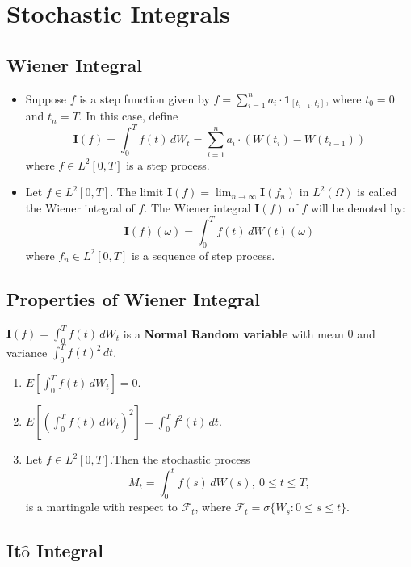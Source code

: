 \documentclass[twoside,final]{hcmut-report}
\begin{document}
\pagebreak

\section{Stochastic Integrals}

\subsection{Wiener Integral}
 \begin{itemize}
        \item Suppose $f$ is a step function given by $f = \sum_{i=1}^n a_i \cdot \mathbf{1}_{[t_{i-1}, t_i]}$, where $t_0 = 0$ and $t_n = T$. In this case, define 
        \[\mathbf{I}(f) = \int_0^{T}{f(t)\,dW_t} = \sum_{i=1}^n a_i \cdot (W(t_i) - W(t_{i-1}))\]
        where $f \in L^2[0,T]$ is a step process.

            \item Let $f \in L^2[0,T]$. The limit $\mathbf{I}(f) = \lim_{n \to \infty} \mathbf{I}(f_n)$ in $L^2(\Omega)$ is called the Wiener integral of $f$. The Wiener integral $\mathbf{I}(f)$ of $f$ will be denoted by:
\[ \mathbf{I}(f)(\omega) = \int_{0}^{T} f(t) \, dW(t)(\omega) \]
 where $f_n \in L^2[0,T]$ is a sequence of step process.
        \end{itemize}

\subsection{Properties of Wiener Integral}
$\mathbf{I}(f) = \int_0^T f(t)\,dW_t$ is a \textbf{Normal Random variable} with mean $0$ and variance $\int_0^T f(t)^{2}\,dt$.
\begin{enumerate}
    \item $E[\int_0^T f(t)\,dW_t] = 0$.
    \item $E[(\int_0^T f(t)\,dW_t)^{2}] = \int_0^T f^{2}(t)\,dt$.
    \item Let $f \in L^2[0,T]$.Then the stochastic process \[ M_t = \int_0^t f(s)\,dW(s),\ 0 \leq t \leq T,\] is a martingale with respect to $\mathcal{F}_t$, where $\mathcal{F}_t = \sigma\{W_s:0\leq s\leq t\}$.
\end{enumerate}
\subsection{\texorpdfstring{It$\hat{\text{o}}$ Integral}{Ito Integral}}
\end{document}
